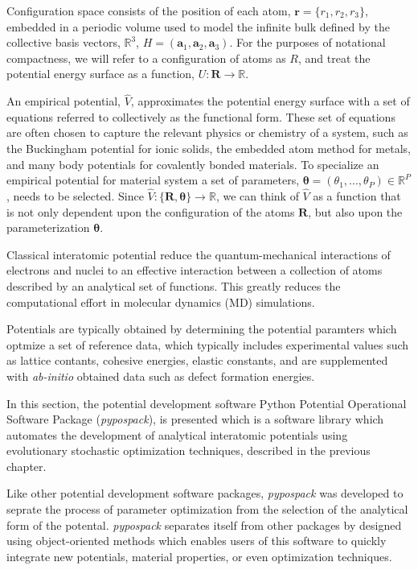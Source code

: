 Configuration space consists of the position of each atom, $\bm{r}=\{r_1,r_2,r_3\}$, embedded in a periodic volume used to model the infinite bulk defined by the collective basis vectors, $\mathbb{R}^3$, $H=(\bm{a}_1,\bm{a}_2,\bm{a}_3)$.
For the purposes of notational compactness, we will refer to a configuration of atoms as $R$, and treat the potential energy surface as a function, $U:\bm{R}\rightarrow\mathbb{R}$.

An empirical potential, $\hat{V}$, approximates the potential energy surface with a set of equations referred to collectively as the functional form.
These set of equations are often chosen to capture the relevant physics or chemistry of a system, such as the Buckingham potential for ionic solids, the embedded atom method for metals, and many body potentials for covalently bonded materials.
To specialize an empirical potential for material system a set of parameters, $\bm{\theta}=(\theta_1,...,\theta_P)\in\mathbb{R}^P$, needs to be selected.
Since $\hat{V}:\{\bm{R},\bm{\theta}\}\rightarrow\mathbb{R}$, we can think of $\hat{V}$ as a function that is not only dependent upon the configuration of the atoms $\bm{R}$, but also upon the parameterization $\bm{\theta}$.

Classical interatomic potential reduce the quantum-mechanical interactions of electrons and nuclei to an effective interaction between a collection of atoms described by an analytical set of functions.
This greatly reduces the computational effort in molecular dynamics (MD) simulations.

Potentials are typically obtained by determining the potential paramters which optmize a set of reference data, which typically includes experimental values such as lattice contants, cohesive energies, elastic constants, and are supplemented with \emph{ab-initio} obtained data such as defect formation energies.

In this section, the potential development software Python Potential Operational Software Package (\emph{pypospack}), is presented which is a software library which automates the development of analytical interatomic potentials using evolutionary stochastic optimization techniques, described in the previous chapter.

Like other potential development software packages, \emph{pypospack} was developed to seprate the process of parameter optimization from the selection of the analytical form of the potental.  \emph{pypospack} separates itself from other packages by designed using object-oriented methods which enables users of this software to quickly integrate new potentials, material properties, or even optimization techniques.

